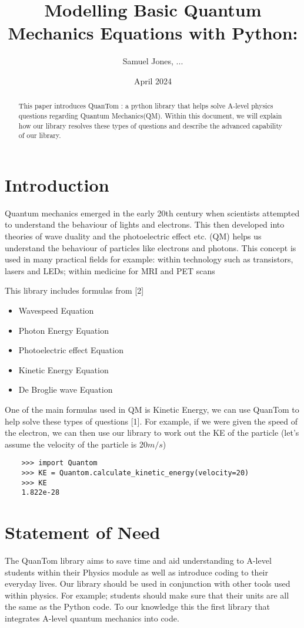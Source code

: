\documentclass{article}
\title{Modelling Basic Quantum Mechanics Equations with Python:  }
\author{Samuel Jones, ...}
\date{April 2024}
\begin{document}
\maketitle

\begin{abstract}
This paper introduces QuanTom : a python library that helps solve A-level physics questions regarding Quantum Mechanics(QM). Within this document, we will explain how our library resolves these types of questions and describe the advanced capability of our library.
\end{abstract}

\section{Introduction}
Quantum mechanics emerged in the early 20th century when scientists attempted to understand the behaviour of lights and electrons. This then developed into theories of wave duality and the photoelectric effect etc. (QM) helps us understand the behaviour of particles like electrons and photons. This concept is used in many practical fields for example: within technology such as transistors, lasers and LEDs; within medicine for MRI and PET scans

This library includes formulas from [2]
\begin{itemize}
    \item Wavespeed Equation
    \item Photon Energy Equation
    \item Photoelectric effect Equation
    \item Kinetic Energy Equation
    \item De Broglie wave Equation
\end{itemize}
One of the main formulas used in QM is Kinetic Energy, we can use QuanTom to help solve these types of questions [1]. For example, if we were given the speed of the electron, we can then use our library to work out the KE of the particle (let's assume the velocity of the particle is 20$m/s$)
\begin{verbatim}
    >>> import Quantom
    >>> KE = Quantom.calculate_kinetic_energy(velocity=20)
    >>> KE
    1.822e-28
\end{verbatim}

\section{Statement of Need}
The QuanTom library aims to save time and aid understanding to A-level students within their Physics module as well as introduce coding to their everyday lives. Our library should be used in conjunction with other tools used within physics. For example; students should make sure that their units are all the same as the Python code. To our knowledge this the first library that integrates A-level quantum mechanics into code.
\end{document}

